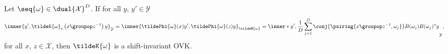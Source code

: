 \begin{proposition}
    Let $\seq{\omega}\in\dual{\mathcal{X}}^D$. If for all $y$,
    $y'\in\mathcal{Y}$
    \begin{dmath*}
        \inner{y', \tildeK{\omega}_e\left(x\groupop
        z^{-1}\right)y}_{\mathcal{Y}}
        =\inner{\tildePhi{\omega}(x)y',
        \tildePhi{\omega}(z)y}_{\tildeH{\omega}}
        =\inner*{y', \frac{1}{D}\sum_{j=1}^D \conj{\pairing{x\groupop
        z^{-1},\omega_j}}B(\omega_j)B(\omega_j)^*y}_{\mathcal{Y}},
    \end{dmath*}
    for all $x$, $z\in\mathcal{X}$, then $\tildeK{\omega}$ is a shift-invariant
    \acl{OVK}.
\end{proposition}

